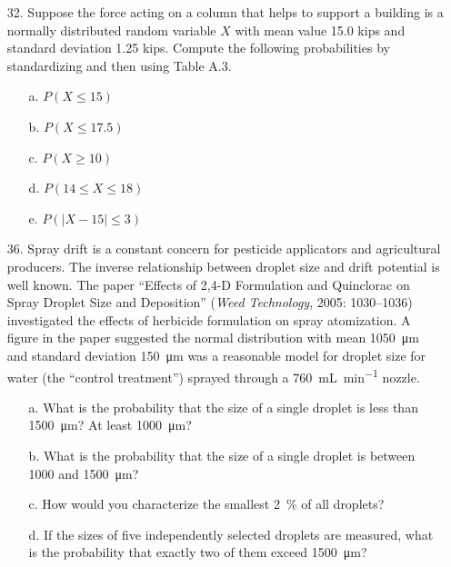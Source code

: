 \documentclass[letterpaper,12pt]{article}
\begin{document}
\begin{enumerate}
\begin{enumerate}
    \end{enumerate}
  \item[32.]
    Suppose the force acting on a column that helps to support a building is a normally distributed random variable $X$ with mean value 15.0 kips and standard deviation 1.25 kips. Compute the following probabilities by standardizing and then using Table A.3.
    \begin{enumerate}
      \item[a.]
        $P(X \le 15)$
      \item[b.]
        $P(X \le 17.5)$
      \item[c.]
        $P(X \ge 10)$
      \item[d.]
        $P(14 \le X \le 18)$
      \item[e.]
        $P(|X - 15| \le 3)$
    \end{enumerate}
  \item[36.]
    Spray drift is a constant concern for pesticide applicators and agricultural producers. The inverse relationship between droplet size and drift potential is well known. The paper ``Effects of 2,4-D Formulation and Quinclorac on Spray Droplet Size and Deposition'' (\textit{Weed Technology}, 2005: 1030–1036) investigated the effects of herbicide formulation on spray atomization. A figure in the paper suggested the normal distribution with mean \qty{1050}{\micro\meter} and standard deviation \qty{150}{\micro\meter} was a reasonable model for droplet size for water (the ``control treatment'') sprayed through a \qty{760}{\milli\liter\per\minute} nozzle.
    \begin{enumerate}
      \item[a.]
        What is the probability that the size of a single droplet is less than \qty{1500}{\micro\meter}? At least \qty{1000}{\micro\meter}?
      \item[b.]
        What is the probability that the size of a single droplet is between 1000 and \qty{1500}{\micro\meter}?
      \item[c.]
        How would you characterize the smallest \qty{2}{\percent} of all droplets?
      \item[d.]
        If the sizes of five independently selected droplets are measured, what is the probability that exactly two of them exceed \qty{1500}{\micro\meter}?
    \end{enumerate}
\end{enumerate}
\end{document}
